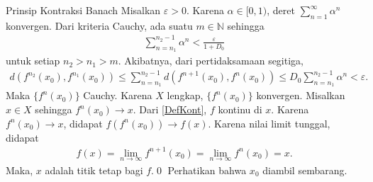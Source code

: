 \documentclass[xcolor={dvipsnames}, 9pt]{beamer}
\begin{document}
	\begin{frame}{Prinsip Kontraksi Banach}
		Misalkan $\varepsilon>0$. Karena $\alpha\in[0,1)$, deret $\sum_{n=1}^{\infty}\alpha^n$ konvergen. Dari kriteria Cauchy, ada suatu $m\in\mathbb{N}$ sehingga
		\begin{align*}
			\sum_{n=n_1}^{n_2-1}\alpha^n < \frac{\varepsilon}{1+D_0}
		\end{align*}
		untuk setiap $n_2>n_1>m$. Akibatnya, dari pertidaksamaan segitiga,
		\begin{align}\label{BCPpro1}
			d(f^{n_2}(x_0),f^{n_1}(x_0))\leq\sum_{n=n_1}^{n_2-1}d(f^{n+1}(x_0),f^n(x_0))\leq D_0\sum_{n=n_1}^{n_2-1}\alpha^n < \varepsilon.
		\end{align}
		Maka $\{f^n(x_0)\}$ Cauchy. Karena $X$ lengkap, $\{f^n(x_0)\}$ konvergen. Misalkan $x\in X$ sehingga $f^n(x_0)\to x$. Dari \eqref{DefKont}, $f$ kontinu di $x$. Karena $f^n(x_0)\to x$, didapat $f(f^n(x_0))\to f(x)$. Karena nilai limit tunggal, didapat
		\begin{align*}
			f(x) = \lim_{n\to\infty}f^{n+1}(x_0) = \lim_{n\to\infty}f^n(x_0) = x.
		\end{align*}
		Maka, $x$ adalah titik tetap bagi $f$.\qed\newline
		Perhatikan bahwa $x_0$ diambil sembarang.
	\end{frame}
\end{document}
